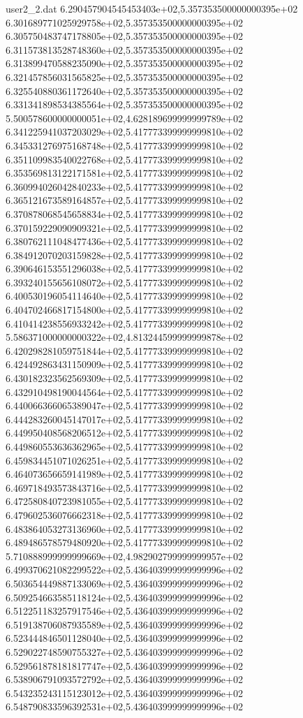 \begin{filecontents}{user2_2.dat}
6.290457904545453403e+02,5.357353500000000395e+02
6.301689771025929758e+02,5.357353500000000395e+02
6.305750483747178805e+02,5.357353500000000395e+02
6.311573813528748360e+02,5.357353500000000395e+02
6.313899470588235090e+02,5.357353500000000395e+02
6.321457856031565825e+02,5.357353500000000395e+02
6.325540880361172640e+02,5.357353500000000395e+02
6.331341898534385564e+02,5.357353500000000395e+02
5.500578600000000051e+02,4.628189699999999789e+02
6.341225941037203029e+02,5.417773399999999810e+02
6.345331276975168748e+02,5.417773399999999810e+02
6.351109983540022768e+02,5.417773399999999810e+02
6.353569813122171581e+02,5.417773399999999810e+02
6.360994026042840233e+02,5.417773399999999810e+02
6.365121673589164857e+02,5.417773399999999810e+02
6.370878068545658834e+02,5.417773399999999810e+02
6.370159229090909321e+02,5.417773399999999810e+02
6.380762111048477436e+02,5.417773399999999810e+02
6.384912070203159828e+02,5.417773399999999810e+02
6.390646153551296038e+02,5.417773399999999810e+02
6.393240155656108072e+02,5.417773399999999810e+02
6.400530196054114640e+02,5.417773399999999810e+02
6.404702466817154800e+02,5.417773399999999810e+02
6.410414238556933242e+02,5.417773399999999810e+02
5.586371000000000322e+02,4.813244599999999878e+02
6.420298281059751844e+02,5.417773399999999810e+02
6.424492863431150909e+02,5.417773399999999810e+02
6.430182323562569309e+02,5.417773399999999810e+02
6.432910498190044564e+02,5.417773399999999810e+02
6.440066366065389047e+02,5.417773399999999810e+02
6.444283260045147017e+02,5.417773399999999810e+02
6.449950408568206512e+02,5.417773399999999810e+02
6.449860553636362965e+02,5.417773399999999810e+02
6.459834451071026251e+02,5.417773399999999810e+02
6.464073656659141989e+02,5.417773399999999810e+02
6.469718493573843716e+02,5.417773399999999810e+02
6.472580840723981055e+02,5.417773399999999810e+02
6.479602536076662318e+02,5.417773399999999810e+02
6.483864053273136960e+02,5.417773399999999810e+02
6.489486578579480920e+02,5.417773399999999810e+02
5.710888999999999669e+02,4.982902799999999957e+02
6.499370621082299522e+02,5.436403999999999996e+02
6.503654449887133069e+02,5.436403999999999996e+02
6.509254663585118124e+02,5.436403999999999996e+02
6.512251183257917546e+02,5.436403999999999996e+02
6.519138706087935589e+02,5.436403999999999996e+02
6.523444846501128040e+02,5.436403999999999996e+02
6.529022748590755327e+02,5.436403999999999996e+02
6.529561878181817747e+02,5.436403999999999996e+02
6.538906791093572792e+02,5.436403999999999996e+02
6.543235243115123012e+02,5.436403999999999996e+02
6.548790833596392531e+02,5.436403999999999996e+02

\end{filecontents}
